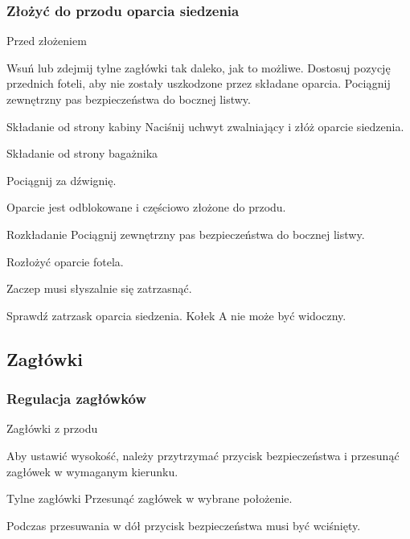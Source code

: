 \subsubsection{Złożyć do przodu oparcia siedzenia}

Przed złożeniem
\begin{itemizeArrow}
	\itemArrow Wsuń lub zdejmij tylne zagłówki tak daleko, jak to możliwe.
	\itemArrow Dostosuj pozycję przednich foteli, aby nie zostały uszkodzone przez składane oparcia.
	\itemArrow Pociągnij zewnętrzny pas bezpieczeństwa do bocznej listwy.
\end{itemizeArrow}

Składanie od strony kabiny
Naciśnij uchwyt zwalniający i złóż oparcie siedzenia.

Składanie od strony bagażnika
\begin{itemizeArrow}
	\itemArrow Pociągnij za dźwignię.
\end{itemizeArrow}
Oparcie jest odblokowane i częściowo złożone do przodu.

Rozkładanie
Pociągnij zewnętrzny pas bezpieczeństwa do bocznej listwy.
\begin{itemizeArrow}
	\itemArrow Rozłożyć oparcie fotela.
\end{itemizeArrow}
Zaczep musi słyszalnie się zatrzasnąć.
\begin{itemizeArrow}
	\itemArrow Sprawdź zatrzask oparcia siedzenia. Kołek A nie może być widoczny.
\end{itemizeArrow}

\subsection{Zagłówki}

\subsubsection{Regulacja zagłówków}

Zagłówki z przodu
\begin{itemizeArrow}
	\itemArrow Aby ustawić wysokość, należy przytrzymać przycisk bezpieczeństwa i przesunąć zagłówek w wymaganym kierunku.
\end{itemizeArrow}

Tylne zagłówki
Przesunąć zagłówek w wybrane położenie.

Podczas przesuwania w dół przycisk bezpieczeństwa musi być wciśnięty.

